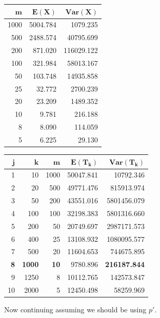 \documentclass[11pt]{extarticle}
\begin{document}
\begin{table}[H]
\scriptsize
\centering
\begin{tabular}{rrr}
\toprule
$\mathbf{m}$  & $\mathbf{E(X)}$ & $\mathbf{Var(X)}$ \\
\midrule
1000	&	5004.784	&	1079.235	\\
500	&	2488.574	&	40795.699	\\
200	&	871.020	&	116029.122	\\
100	&	321.984	&	58013.167	\\
50	&	103.748	&	14935.858	\\
25	&	32.772	&	2700.239	\\
20	&	23.209	&	1489.352	\\
10	&	9.781	&	216.188	\\
8	&	8.090	&	114.059	\\
5	&	6.225	&	29.130	\\
\bottomrule
\end{tabular}
\quad 
\begin{tabular}{rrrrr}
\toprule
$\mathbf{j}$ & $\mathbf{k}$ & $\mathbf{m}$  & $\mathbf{E(T_k)}$  & $\mathbf{Var(T_k)}$ \\
\midrule
1	&	10	&	1000	&	50047.841	&	10792.346	\\
2	&	20	&	500	&	49771.476	&	815913.974	\\
3	&	50	&	200	&	43551.016	&	5801456.079	\\
4	&	100	&	100	&	32198.383	&	5801316.660	\\
5	&	200	&	50	&	20749.697	&	2987171.573	\\
6	&	400	&	25	&	13108.932	&	1080095.577	\\
7	&	500	&	20	&	11604.653	&	744675.895	\\
\textbf{8}	&	\textbf{1000}	&	\textbf{10}	&	$\boxed{\mathbf{9780.896}}$	&	\textbf{216187.844}	\\
9	&	1250	&	8	&	10112.765	&	142573.847	\\
10	&	2000	&	5	&	12450.498	&	58259.969	\\
\bottomrule
\end{tabular}
\end{table}

Now continuing assuming we should be using $p'$.
\end{document}
